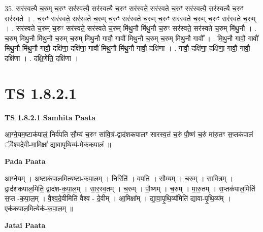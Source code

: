 \documentclass[17pt]{extarticle}
\begin{document}
35. सर॑स्वत्यै च॒रुम् च॒रुꣳ सर॑स्वत्यै॒ सर॑स्वत्यै च॒रुꣳ सर॑स्वते॒ सर॑स्वते च॒रुꣳ सर॑स्वत्यै॒ सर॑स्वत्यै च॒रुꣳ सर॑स्वते । . च॒रुꣳ सर॑स्वते॒ सर॑स्वते च॒रुम् च॒रुꣳ सर॑स्वते च॒रुम् च॒रुꣳ सर॑स्वते च॒रुम् च॒रुꣳ सर॑स्वते च॒रुम् । . सर॑स्वते च॒रुम् च॒रुꣳ सर॑स्वते॒ सर॑स्वते च॒रुम् मि॑थु॒नौ मि॑थु॒नौ च॒रुꣳ सर॑स्वते॒ सर॑स्वते च॒रुम् मि॑थु॒नौ । . च॒रुम् मि॑थु॒नौ मि॑थु॒नौ च॒रुम् च॒रुम् मि॑थु॒नौ गावौ॒ गावौ॑ मिथु॒नौ च॒रुम् च॒रुम् मि॑थु॒नौ गावौ᳚ । . मि॒थु॒नौ गावौ॒ गावौ॑ मिथु॒नौ मि॑थु॒नौ गावौ॒ दक्षि॑णा॒ दक्षि॑णा॒ गावौ॑ मिथु॒नौ मि॑थु॒नौ गावौ॒ दक्षि॑णा । . गावौ॒ दक्षि॑णा॒ दक्षि॑णा॒ गावौ॒ गावौ॒ दक्षि॑णा । . दक्षि॒णेति॒ दक्षि॑णा । \newline
\pagebreak
{}

\section{ TS 1.8.2.1 }

\textbf{TS 1.8.2.1 } \newline
\textbf{Samhita Paata} \newline

आ॒ग्ने॒यम॒ष्टाक॑पालं॒ निर्व॑पति सौ॒म्यं च॒रुꣳ सा॑वि॒त्रं-द्वाद॑शकपालꣳ सारस्व॒तं च॒रुं पौ॒ष्णं च॒रुं मा॑रु॒तꣳ स॒प्तक॑पालं ॅवैश्वदे॒वी-मा॒मिक्षां᳚ द्यावापृथि॒व्य॑-मेक॑कपालं ॥ \newline

\textbf{Pada Paata} \newline

आ॒ग्ने॒यम् । अ॒ष्टाक॑पाल॒मित्य॒ष्टा-क॒पा॒ल॒म् । निरिति॑ । व॒प॒ति॒ । सौ॒म्यम् । च॒रुम् । सा॒वि॒त्रम् । द्वाद॑शकपाल॒मिति॒ द्वाद॑श-क॒पा॒ल॒म् । सा॒र॒स्व॒तम् । च॒रुम् । पौ॒ष्णम् । च॒रुम् । मा॒रु॒तम् । स॒प्तक॑पाल॒मिति॑ स॒प्त -क॒पा॒ल॒म् । वै॒श्व॒दे॒वीमिति॑ वैश्व - दे॒वीम् । आ॒मिक्षा᳚म् । द्या॒वा॒पृ॒थि॒व्य॑मिति॑ द्यावा-पृ॒थि॒व्य᳚म् । एक॑कपाल॒मित्येक॑-क॒पा॒ल॒म् ॥  \newline



\textbf{Jatai Paata} \newline
\end{document}
